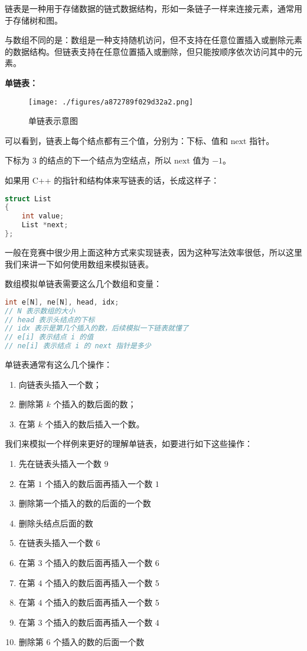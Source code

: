 
链表是一种用于存储数据的链式数据结构，形如一条链子一样来连接元素，通常用于存储树和图。

与数组不同的是：数组是一种支持随机访问，但不支持在任意位置插入或删除元素的数据结构。但链表支持在任意位置插入或删除，但只能按顺序依次访问其中的元素。

\textbf{单链表：}

\begin{figure}[ht]
\centering
\texttt{[image: ./figures/a872789f029d32a2.png]}
\caption{单链表示意图} \label{fig_List_1}
\end{figure}

可以看到，链表上每个结点都有三个值，分别为：下标、值和 $\text{next}$ 指针。

下标为 $3$ 的结点的下一个结点为空结点，所以 $\text{next}$ 值为 $-1$。

如果用 C++ 的指针和结构体来写链表的话，长成这样子：
\begin{lstlisting}[language=cpp]
struct List
{
    int value;
    List *next;
};
\end{lstlisting}

一般在竞赛中很少用上面这种方式来实现链表，因为这种写法效率很低，所以这里我们来讲一下如何使用数组来模拟链表。

数组模拟单链表需要这么几个数组和变量：
\begin{lstlisting}[language=cpp]
int e[N], ne[N], head, idx;
// N 表示数组的大小
// head 表示头结点的下标
// idx 表示是第几个插入的数，后续模拟一下链表就懂了
// e[i] 表示结点 i 的值
// ne[i] 表示结点 i 的 next 指针是多少
\end{lstlisting}

单链表通常有这么几个操作：
\begin{enumerate}
\item 向链表头插入一个数；
\item 删除第 $k$ 个插入的数后面的数；
\item 在第 $k$ 个插入的数后插入一个数。
\end{enumerate}

我们来模拟一个样例来更好的理解单链表，如要进行如下这些操作：

\begin{enumerate}
\item 先在链表头插入一个数 $9$
\item 在第 $1$ 个插入的数后面再插入一个数 $1$
\item 删除第一个插入的数的后面的一个数
\item 删除头结点后面的数
\item 在链表头插入一个数 $6$
\item 在第 $3$ 个插入的数后面再插入一个数 $6$
\item 在第 $4$ 个插入的数后面再插入一个数 $5$
\item 在第 $4$ 个插入的数后面再插入一个数 $5$
\item 在第 $3$ 个插入的数后面再插入一个数 $4$
\item 删除第 $6$ 个插入的数的后面一个数
\end{enumerate}

